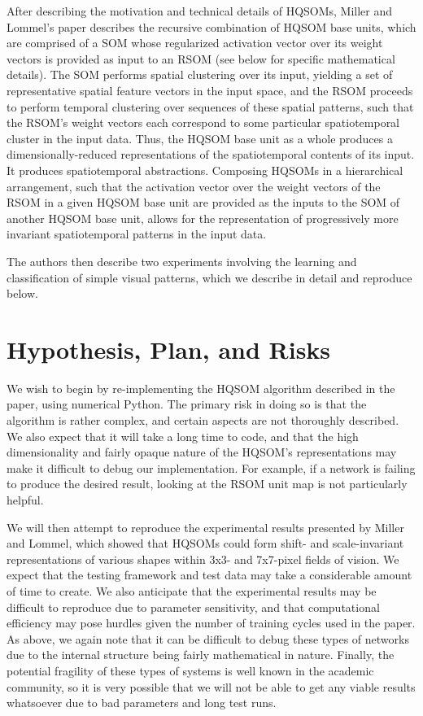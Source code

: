 \documentclass[a4paper,10pt]{article}
\begin{document}
After describing the motivation and technical details of HQSOMs, Miller and Lommel's paper describes
the recursive combination of HQSOM base units, which are comprised of a SOM whose regularized
activation vector over its weight vectors is provided as input to an RSOM (see below for specific
mathematical details). The SOM performs spatial clustering over its input, yielding a set of
representative spatial feature vectors in the input space, and the RSOM proceeds to perform temporal
clustering over sequences of these spatial patterns, such that the RSOM's weight vectors each
correspond to some particular spatiotemporal cluster in the input data. Thus, the HQSOM base unit as
a whole produces a dimensionally-reduced representations of the spatiotemporal contents of its
input. It produces spatiotemporal abstractions. Composing HQSOMs in a hierarchical arrangement, such
that the activation vector over the weight vectors of the RSOM in a given HQSOM base unit are
provided as the inputs to the SOM of another HQSOM base unit, allows for the representation of
progressively more invariant spatiotemporal patterns in the input data.

The authors then describe two experiments involving the learning and classification of simple visual
patterns, which we describe in detail and reproduce below.

\section{Hypothesis, Plan, and Risks}
We wish to begin by re-implementing the HQSOM algorithm described in the paper, using numerical
Python.  The primary risk in doing so is that the algorithm is rather complex, and certain aspects
are not thoroughly described.  We also expect that it will take a long time to code, and that the
high dimensionality and fairly opaque nature of the HQSOM's representations may make it difficult to
debug our implementation.  For example, if a network is failing to produce the desired result,
looking at the RSOM unit map is not particularly helpful.

We will then attempt to reproduce the experimental results presented by Miller and Lommel,
which showed that HQSOMs could form shift- and scale-invariant representations of various shapes
within
3x3- and 7x7-pixel fields of vision.  We expect that the testing framework and test data may take a
considerable amount of time to create.  We also anticipate that the experimental results may be
difficult to reproduce due to parameter sensitivity, and that computational efficiency may pose
hurdles given the number of training cycles used in the paper.  As above, we again note that it can
be difficult to debug these types of networks due to the internal structure being fairly
mathematical in nature.  Finally, the potential fragility of
these types of systems is well known in the academic community, so it is very possible that we will
not be able to get any viable results whatsoever due to bad parameters and long test runs.
\end{document}
